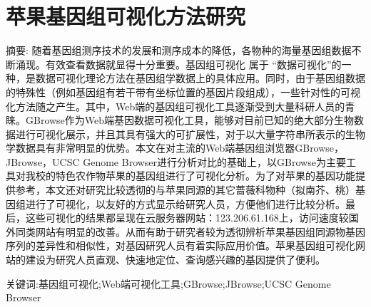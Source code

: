 \chapter*{苹果基因组可视化方法研究}

\vspace{1em}
{\large {\heiti 摘要: }}\normalsize{\songti 
随着基因组测序技术的发展和测序成本的降低，各物种的海量基因组数据不断涌现。有效查看数据就显得十分重要。基因组可视化 属于 “数据可视化”的一种，是数据可视化理论方法在基因组学数据上的具体应用。同时，由于基因组数据的特殊性（例如基因组有若干带有坐标位置的基因片段组成），一些针对性的可视化方法随之产生。其中，Web端的基因组可视化工具逐渐受到大量科研人员的青睐。GBrowse作为Web端基因数据可视化工具，能够对目前已知的绝大部分生物数据进行可视化展示，并且其具有强大的可扩展性，对于以大量字符串所表示的生物学数据具有非常明显的优势。本文在对主流的Web端基因组浏览器GBrowse，JBrowse，UCSC Genome Browser进行分析对比的基础上，以GBrowse为主要工具对我校的特色农作物苹果的基因组进行了可视化分析。为了对苹果的基因功能提供参考，本文还对研究比较透彻的与苹果同源的其它蔷薇科物种（拟南芥、桃）基因组进行了可视化，以友好的方式显示给研究人员，方便他们进行比较分析。最后，这些可视化的结果都呈现在云服务器网站：123.206.61.168上，访问速度较国外同类网站有明显的改善。从而有助于研究者较为透彻辨析苹果基因组同源物基因序列的差异性和相似性，对基因研究人员有着实际应用价值。苹果基因组可视化网站的建设为研究人员直观、快速地定位、查询感兴趣的基因提供了便利。
}

{\large {\heiti 关键词:}}\normalsize{基因组可视化;Web端可视化工具;GBrowse;JBrowse;UCSC Genome Browser}
\thispagestyle{empty}